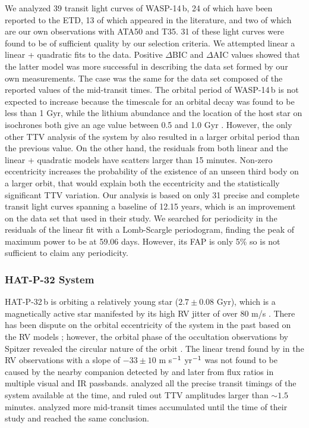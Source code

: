 \documentclass[a4paper,fleqn,usenatbib]{mnras}
\begin{document}
We analyzed 39 transit light curves of WASP-14\,b, 24 of which have been reported to the ETD, 13 of which appeared in the literature, and two of which are our own observations with ATA50 and T35. 31 of these light curves were found to be of sufficient quality by our selection criteria. We attempted linear a linear + quadratic fits to the data. Positive $\Delta$BIC and $\Delta$AIC values showed that the latter model was more successful in describing the data set formed by our own measurements. The case was the same for the data set composed of the reported values of the mid-transit times. The orbital period of WASP-14\,b is not expected to increase because the timescale for an orbital decay was found to be less than 1 Gyr, while the lithium abundance and the location of the host star on isochrones both give an age value between 0.5 and 1.0 Gyr \citep{2009MNRAS.392.1532J}. However, the only other TTV analysis of the system by \citet{2015MNRAS.451.4139R} also resulted in a larger orbital period than the previous value. On the other hand, the residuals from both linear and the linear + quadratic models have scatters larger than 15 minutes. Non-zero eccentricity increases the probability of the existence of an unseen third body on a larger orbit, that would explain both the eccentricity and the statistically significant TTV variation. Our analysis is based on only 31 precise and complete transit light curves spanning a baseline of 12.15 years, which is an improvement on the data set that \citet{2015MNRAS.451.4139R} used in their study. We searched for periodicity in the residuals of the linear fit with a Lomb-Scargle periodogram, finding the peak of maximum power to be at 59.06 days. However, its FAP is only 5\% so is not sufficient to claim any periodicity.

\subsubsection{HAT-P-32 System}
HAT-P-32\,b is orbiting a relatively young star ($2.7 \pm 0.08$ Gyr), which is a magnetically active star manifested by its high RV jitter of over 80 m/s \citep{2011ApJ...742...59H}. There has been dispute on the orbital eccentricity of the system in the past based on the RV models \citep{2011ApJ...742...59H, 2013MNRAS.436.2974G, 2014ApJ...785..126K}; however, the orbital phase of the occultation observations by Spitzer revealed the circular nature of the orbit \cite{2014ApJ...796..115Z}. The linear trend found by \citet{2014ApJ...785..126K} in the RV observations with a slope of $-33 \pm 10$ m s$^{\rm -1}$ yr$^{\rm -1}$ was not found to be caused by the nearby companion detected by \citet{2013AJ....146....9A} and later \cite{2014ApJ...796..115Z} from flux ratios in multiple visual and IR passbands. \cite{2014MNRAS.441..304S} analyzed all the precise transit timings of the system available at the time, and ruled out TTV amplitudes larger than $\sim1.5$ minutes. \citet{2019AJ....157...82W} analyzed more mid-transit times accumulated until the time of their study and reached the same conclusion. 
\end{document}
